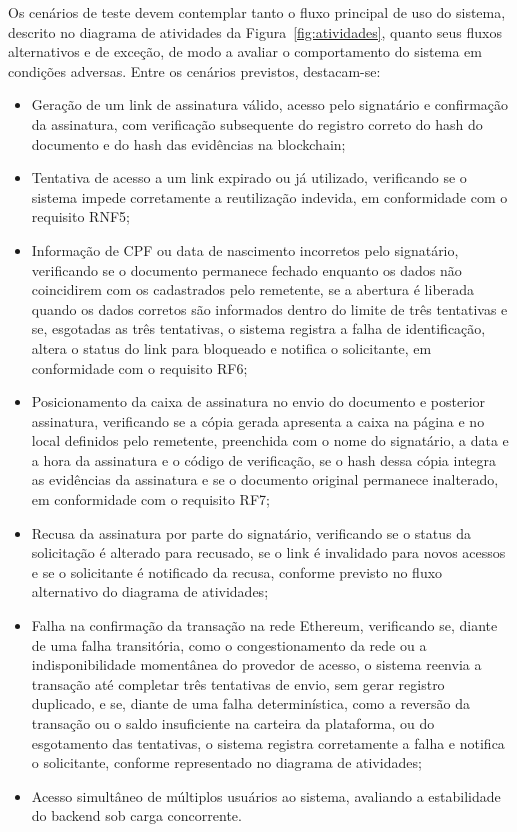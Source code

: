 \documentclass[
    12pt,
    a4paper,
    oneside,
    chapter=TITLE,
    section=TITLE,
    subsection=TITLE,
    subsubsection=TITLE,
    sumario=tradicional,
    english,
    brazil
]{abntex2}
\begin{document}
Os cenários de teste devem contemplar tanto o fluxo principal de uso do sistema, descrito no diagrama de atividades da Figura~\ref{fig:atividades}, quanto seus fluxos alternativos e de exceção, de modo a avaliar o comportamento do sistema em condições adversas. Entre os cenários previstos, destacam-se:
\begin{itemize}

\item Geração de um link de assinatura válido, acesso pelo signatário e confirmação da assinatura, com verificação subsequente do registro correto do hash do documento e do hash das evidências na blockchain;

\item Tentativa de acesso a um link expirado ou já utilizado, verificando se o sistema impede corretamente a reutilização indevida, em conformidade com o requisito RNF5;

\item Informação de CPF ou data de nascimento incorretos pelo signatário, verificando se o documento permanece fechado enquanto os dados não coincidirem com os cadastrados pelo remetente, se a abertura é liberada quando os dados corretos são informados dentro do limite de três tentativas e se, esgotadas as três tentativas, o sistema registra a falha de identificação, altera o status do link para bloqueado e notifica o solicitante, em conformidade com o requisito RF6;

\item Posicionamento da caixa de assinatura no envio do documento e posterior assinatura, verificando se a cópia gerada apresenta a caixa na página e no local definidos pelo remetente, preenchida com o nome do signatário, a data e a hora da assinatura e o código de verificação, se o hash dessa cópia integra as evidências da assinatura e se o documento original permanece inalterado, em conformidade com o requisito RF7;

\item Recusa da assinatura por parte do signatário, verificando se o status da solicitação é alterado para recusado, se o link é invalidado para novos acessos e se o solicitante é notificado da recusa, conforme previsto no fluxo alternativo do diagrama de atividades;

\item Falha na confirmação da transação na rede Ethereum, verificando se, diante de uma falha transitória, como o congestionamento da rede ou a indisponibilidade momentânea do provedor de acesso, o sistema reenvia a transação até completar três tentativas de envio, sem gerar registro duplicado, e se, diante de uma falha determinística, como a reversão da transação ou o saldo insuficiente na carteira da plataforma, ou do esgotamento das tentativas, o sistema registra corretamente a falha e notifica o solicitante, conforme representado no diagrama de atividades;

\item Acesso simultâneo de múltiplos usuários ao sistema, avaliando a estabilidade do backend sob carga concorrente.
\end{itemize}
\end{document}
